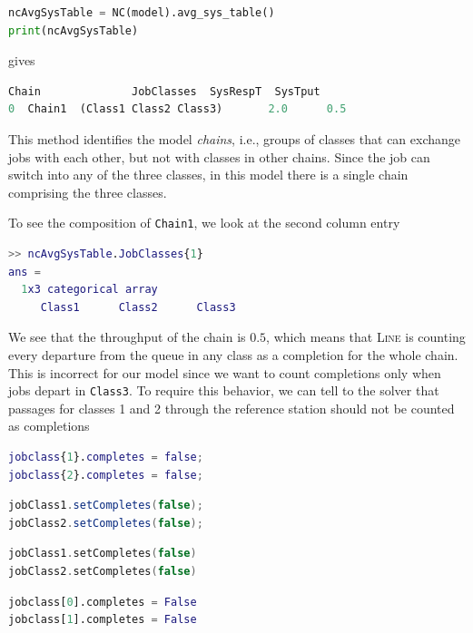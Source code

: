\begin{PYTHON}
\begin{lstlisting}[language = python]
ncAvgSysTable = NC(model).avg_sys_table()
print(ncAvgSysTable)
\end{lstlisting}
gives
\begin{lstlisting}[language = python]
    Chain              JobClasses  SysRespT  SysTput
0  Chain1  (Class1 Class2 Class3)       2.0      0.5
\end{lstlisting}
\end{PYTHON}
This method identifies the model \emph{chains}, i.e., groups of classes that can exchange jobs with each other, but not with classes in other chains. Since the job can switch into any of the three classes, in this model there is a single chain comprising the three classes.


\begin{MATLAB}
To see the composition of \texttt{Chain1}, we look at the second column entry
\begin{lstlisting}[language = matlab]
>> ncAvgSysTable.JobClasses{1}
ans =
  1x3 categorical array
     Class1      Class2      Class3
\end{lstlisting}
\end{MATLAB}

We see that the throughput of the chain is $0.5$, which means that \textsc{Line} is counting every departure from the queue in any class as a completion for the whole chain. This is incorrect for our model since we want to count completions only when jobs depart in \texttt{Class3}. To require this behavior, we can tell to the solver that passages for classes 1 and 2 through the reference station should not be counted as completions
\begin{MATLAB}
\begin{lstlisting}[language = matlab]
jobclass{1}.completes = false;
jobclass{2}.completes = false;
\end{lstlisting}
\end{MATLAB}
\begin{JAVA}
\begin{lstlisting}[language = java, basicstyle=\ttfamily\scriptsize]
jobClass1.setCompletes(false);
jobClass2.setCompletes(false);
\end{lstlisting}
\end{JAVA}
\begin{KOTLIN}
\begin{lstlisting}[language = kotlin, basicstyle=\ttfamily\scriptsize]
jobClass1.setCompletes(false)
jobClass2.setCompletes(false)
\end{lstlisting}
\end{KOTLIN}
\begin{PYTHON}
\begin{lstlisting}[language = python]
jobclass[0].completes = False
jobclass[1].completes = False
\end{lstlisting}
\end{PYTHON}


